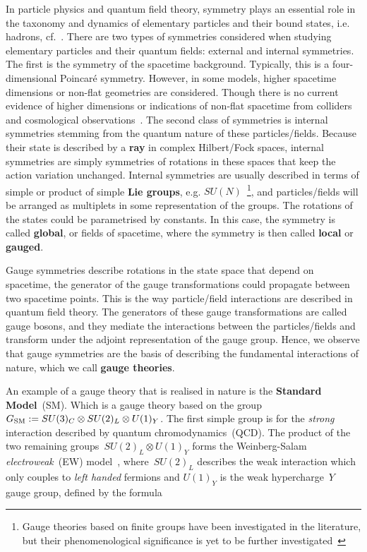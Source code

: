 \par In particle physics and quantum field theory, symmetry plays an essential role in the taxonomy and dynamics of elementary particles and their bound states, i.e. hadrons, cf.~\cite{osti_4008239,PhysRev.96.191}. There are two types of symmetries considered when studying elementary particles and their quantum fields: external and internal symmetries. The first is the symmetry of the spacetime background. Typically, this is a four-dimensional Poincar\'e symmetry. However, in some models, higher spacetime dimensions or non-flat geometries are considered. Though there is no current evidence of higher dimensions or indications of non-flat spacetime from colliders and cosmological observations~\cite{Zyla:2020zbs}. The second class of symmetries is internal symmetries stemming from the quantum nature of these particles/fields. Because their state is described by a \textbf{ray} in complex Hilbert/Fock spaces, internal symmetries are simply symmetries of rotations in these spaces that keep the action variation unchanged. Internal symmetries are usually described in terms of simple or product of simple \textbf{Lie groups}, e.g. $SU(N)$~\footnote{Gauge theories based on finite groups have been investigated in the literature, but their phenomenological significance is yet to be further investigated~\cite{Freed1993LecturesOT,dijkgraaf1990topological}}, and particles/fields will be arranged as multiplets in some representation of the groups. The rotations of the states could be parametrised by constants. In this case, the symmetry is called \textbf{global}, or fields of spacetime, where the symmetry is then called \textbf{local} or \textbf{gauged}.
\par Gauge symmetries describe rotations in the state space that depend on spacetime, the generator of the gauge transformations could propagate between two spacetime points. This is the way particle/field interactions are described in quantum field theory. The generators of these gauge transformations are called gauge bosons, and they mediate the interactions between the particles/fields and transform under the adjoint representation of the gauge group. Hence, we observe that gauge symmetries are the basis of describing the fundamental interactions of nature, which we call \textbf{gauge theories}.
\par An example of a gauge theory that is realised in nature is the \textbf{Standard Model}~(SM). Which is a gauge theory based on the group~$G_{\mathrm{SM}}:=SU(3)_C \otimes SU(2)_L \otimes U(1)_Y$. The first simple group is for the \textit{strong} interaction described by quantum chromodynamics~(QCD). The product of the two remaining groups~$SU(2)_L \otimes U(1)_Y$ forms the Weinberg-Salam \textit{electroweak}~(EW) model~\cite{salam1,salam2,PhysRevLett.19.1264}, where~$SU(2)_L$ describes the weak interaction which only couples to \emph{left handed} fermions and $U(1)_Y$ is the weak hypercharge~$Y$ gauge group, defined by the formula
